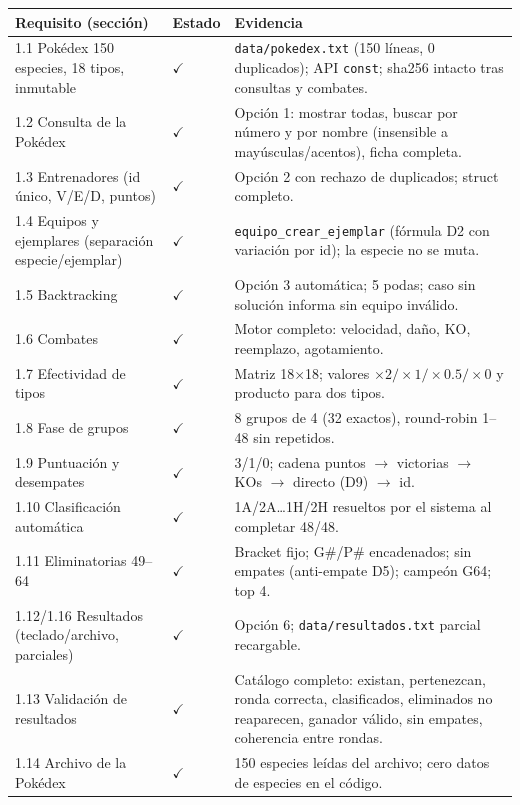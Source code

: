 \documentclass[11pt,a4paper]{article}
\begin{document}
\begin{longtable}{p{5.2cm} p{2.0cm} p{8.0cm}}
\toprule
\textbf{Requisito (secci\'on)} & \textbf{Estado} & \textbf{Evidencia} \\
\midrule
1.1 Pok\'edex 150 especies, 18 tipos, inmutable & $\checkmark$ & \texttt{data/pokedex.txt} (150 l\'ineas, 0 duplicados); API \texttt{const}; sha256 intacto tras consultas y combates. \\
1.2 Consulta de la Pok\'edex & $\checkmark$ & Opci\'on 1: mostrar todas, buscar por n\'umero y por nombre (insensible a may\'usculas/acentos), ficha completa. \\
1.3 Entrenadores (id \'unico, V/E/D, puntos) & $\checkmark$ & Opci\'on 2 con rechazo de duplicados; struct completo. \\
1.4 Equipos y ejemplares (separaci\'on especie/ejemplar) & $\checkmark$ & \texttt{equipo\_crear\_ejemplar} (f\'ormula D2 con variaci\'on por id); la especie no se muta. \\
1.5 Backtracking & $\checkmark$ & Opci\'on 3 autom\'atica; 5 podas; caso sin soluci\'on informa sin equipo inv\'alido. \\
1.6 Combates & $\checkmark$ & Motor completo: velocidad, da\~no, KO, reemplazo, agotamiento. \\
1.7 Efectividad de tipos & $\checkmark$ & Matriz 18$\times$18; valores $\times2/\times1/\times0.5/\times0$ y producto para dos tipos. \\
1.8 Fase de grupos & $\checkmark$ & 8 grupos de 4 (32 exactos), round-robin 1--48 sin repetidos. \\
1.9 Puntuaci\'on y desempates & $\checkmark$ & 3/1/0; cadena puntos $\to$ victorias $\to$ KOs $\to$ directo (D9) $\to$ id. \\
1.10 Clasificaci\'on autom\'atica & $\checkmark$ & 1A/2A\dots1H/2H resueltos por el sistema al completar 48/48. \\
1.11 Eliminatorias 49--64 & $\checkmark$ & Bracket fijo; G\#/P\# encadenados; sin empates (anti-empate D5); campe\'on G64; top 4. \\
1.12/1.16 Resultados (teclado/archivo, parciales) & $\checkmark$ & Opci\'on 6; \texttt{data/resultados.txt} parcial recargable. \\
1.13 Validaci\'on de resultados & $\checkmark$ & Cat\'alogo completo: existan, pertenezcan, ronda correcta, clasificados, eliminados no reaparecen, ganador v\'alido, sin empates, coherencia entre rondas. \\
1.14 Archivo de la Pok\'edex & $\checkmark$ & 150 especies le\'idas del archivo; cero datos de especies en el c\'odigo. \\

\end{longtable}
\end{document}
